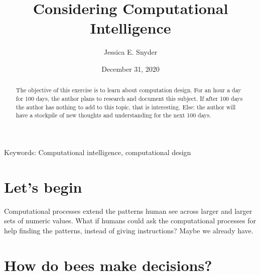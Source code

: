 \documentclass[a4paper,11pt]{article}
\begin{document}
\title{Considering Computational Intelligence}
\author{Jessica E. Snyder}
\date{December 31, 2020}
\maketitle

\begin{abstract}
The objective of this exercise is to learn about computation design. For an hour a day for 100 days, the author plans to research and document this subject. If after 100 days the author has nothing to add to this topic, that is interesting. Else: the author will have a stockpile of new thoughts and understanding for the next 100 days.
\end{abstract}

Keywords: Computational intelligence, computational design

\tableofcontents

\section{Let's begin}
Computational processes extend the patterns human see across larger and larger sets of numeric values. What if humans could ask the computational processes for help finding the patterns, instead of giving instructions? Maybe we already have.  


\section{How do bees make decisions?}
\end{document}
